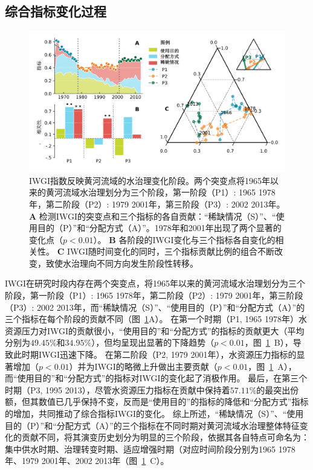 \subsection{综合指标变化过程}\label{ch4:sec:process}

\begin{figure}[ht!]
	\centering
	\includegraphics[width=\textwidth]{img/ch4/ch4_index.png}
	\caption[IWGI指数反映黄河流域的水治理变化阶段]{IWGI指数反映黄河流域的水治理变化阶段。两个突变点将1965年以来的黄河流域水治理划分为三个阶段，第一阶段（P1）: 1965 \textendash{} 1978年，第二阶段（P2）: 1979 \textendash{} 2001年，第三阶段（P3）: 2002 \textendash{} 2013年。
	\textbf{A} 检测IWGI的突变点和三个指标的各自贡献：“稀缺情况（S）”、“使用目的（P）”和“分配方式（A）”。1978年和2001年出现了两个显著的变化点（$p<0.01$）。
	\textbf{B}  各阶段的IWGI变化与三个指标各自变化的相关性。
	\textbf{C} IWGI随时间变化的同时，三个指标贡献比例的组合不断改变，致使水治理向不同方向发生阶段性转移。
	}\label{ch4:fig:IWGI}
\end{figure}

IWGI在研究时段内存在两个突变点，将1965年以来的黄河流域水治理划分为三个阶段，第一阶段（P1）: 1965 \textendash{} 1978年，第二阶段（P2）: 1979 \textendash{} 2001年，第三阶段（P3）: 2002 \textendash{} 2013年，而“稀缺情况（S）”、“使用目的（P）”和“分配方式（A）”的三个指标在每个阶段的贡献不同（图~\ref{ch4:fig:IWGI}A）。
在第一个时期（P1, 1965 \textendash{} 1978年）水资源压力对IWGI的贡献很小，“使用目的”和“分配方式”的指标的贡献更大（平均分别为$49.45\%$和$34.95\%$），但均呈现出显著的下降趋势（$p<0.01$，图~\ref{ch4:fig:IWGI}~B），导致此时期IWGI迅速下降。
在第二阶段（P2, 1979 \textendash{} 2001年），水资源压力指标的显著增加（$p<0.01$）并为IWGI的略微上升做出主要贡献（$p<0.01$，图~\ref{ch4:fig:IWGI}~A），而“使用目的”和“分配方式”的指标对IWGI的变化起了消极作用。
最后，在第三个时期（P3, 1995 \textendash{} 2013），尽管水资源压力指标在贡献中保持着$57.11\%$的最突出份额，但其数值已几乎保持不变，反而是“使用目的”的指标的降低和“分配方式”指标的增加，共同推动了综合指标IWGI的变化。
综上所述，“稀缺情况（S）”、“使用目的（P）”和“分配方式（A）”的三个指标在不同时期对黄河流域水治理整体特征变化的贡献不同，将其演变历史划分为明显的三个阶段，依据其各自特点可命名为：集中供水时期、治理转变时期、适应增强时期（对应时间阶段分别为1965 \textendash{} 1978年、1979 \textendash{} 2001年、2002 \textendash{} 2013年（图~\ref{ch4:fig:IWGI}~C）。

